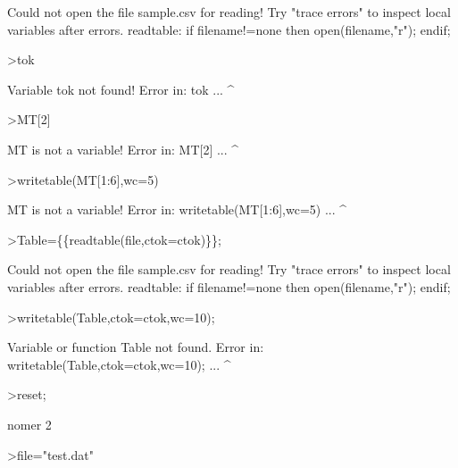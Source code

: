\documentclass[a4paper,10pt]{article}
\begin{document}
\begin{eulernotebook}
\begin{eulercomment}
\begin{eulercomment}
\begin{eulercomment}
\begin{eulercomment}
\begin{eulercomment}
\begin{eulercomment}
\begin{eulercomment}
\begin{eulercomment}
\begin{eulercomment}
\begin{eulercomment}
\begin{eulerprompt}
\end{eulerprompt}
\begin{euleroutput}
  Could not open the file
  sample.csv
  for reading!
  Try "trace errors" to inspect local variables after errors.
  readtable:
      if filename!=none then open(filename,"r"); endif;
\end{euleroutput}
\begin{eulerprompt}
>tok
\end{eulerprompt}
\begin{euleroutput}
  Variable tok not found!
  Error in:
  tok ...
     ^
\end{euleroutput}
\begin{eulerprompt}
>MT[2]
\end{eulerprompt}
\begin{euleroutput}
  MT is not a variable!
  Error in:
  MT[2] ...
       ^
\end{euleroutput}
\begin{eulerprompt}
>writetable(MT[1:6],wc=5)
\end{eulerprompt}
\begin{euleroutput}
  MT is not a variable!
  Error in:
  writetable(MT[1:6],wc=5) ...
                    ^
\end{euleroutput}
\begin{eulerprompt}
>Table=\{\{readtable(file,ctok=ctok)\}\}; 
\end{eulerprompt}
\begin{euleroutput}
  Could not open the file
  sample.csv
  for reading!
  Try "trace errors" to inspect local variables after errors.
  readtable:
      if filename!=none then open(filename,"r"); endif;
\end{euleroutput}
\begin{eulerprompt}
>writetable(Table,ctok=ctok,wc=10);
\end{eulerprompt}
\begin{euleroutput}
  Variable or function Table not found.
  Error in:
  writetable(Table,ctok=ctok,wc=10); ...
                  ^
\end{euleroutput}
\begin{eulerprompt}
>reset;
\end{eulerprompt}
\eulersubheading{}
\begin{eulercomment}
nomer 2
\end{eulercomment}
\begin{eulerprompt}
>file="test.dat"
\end{eulerprompt}
\begin{euleroutput}

\end{euleroutput}
\end{eulercomment}
\end{eulercomment}
\end{eulercomment}
\end{eulercomment}
\end{eulercomment}
\end{eulercomment}
\end{eulercomment}
\end{eulercomment}
\end{eulercomment}
\end{eulercomment}
\end{eulernotebook}
\end{document}
